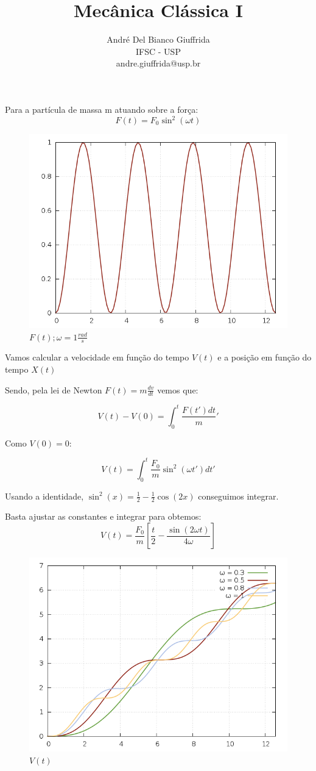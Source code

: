 \documentclass[a4paper,12pt]{article}
\title{ Mecânica Clássica I}
\author{\small André Del Bianco Giuffrida\\ \small IFSC - USP\\ \small andre.giuffrida@usp.br}
\date{}
\begin{document}
\maketitle
	Para a partícula de massa m atuando sobre a força:
		\[ F(t)= F_0 \sin^2(\omega t) \]
		\begin{figure}[h]
			\centering
			\includegraphics[scale=0.3]{1o1.png}
			\caption{$F(t) ; \omega = 1 \frac{rad}{s}$}
		\end{figure}
		
	Vamos calcular a velocidade em função do tempo $V(t)$ e a posição em função do tempo $X(t)$
	
	Sendo, pela lei de Newton $F(t) = m\frac{dv}{dt}$ vemos que:
	
	\[  V(t) - V(0)  = \int_{0}^{t} \frac{F(t') dt}{m}' \]
	
	Como $V(0)=0$:
	
	\[ V(t) = \int_{0}^{t} \frac{F_0}{m} \sin^2(\omega t')  dt' \]
	
	Usando a identidade, $\sin^2(x) = \frac{1}{2} - \frac{1}{2} \cos(2x)$ conseguimos integrar.
	
	Basta ajustar as constantes e integrar para obtemos:
		\[ V(t)= \frac{F_0}{m} \left[\frac{t}{2}-\frac{\sin(2\omega t)}{4\omega}\right] \]
		\begin{figure}[h]
			\centering
			\includegraphics[scale=0.6]{1o2.png}
			\caption{$V(t)$}
		\end{figure}
		
\end{document}
